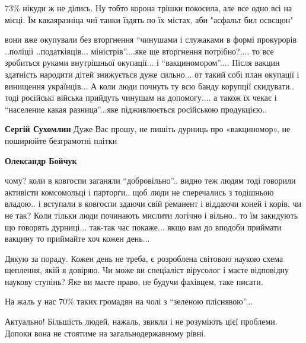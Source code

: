 \begin{itemize}
{

73\% нікуди ж не ділись. Ну тобто корона трішки покосила, але все одно всі на
місці. Їм какаяразніца чиї танки їздять по їх містах, аби "асфальт бил освєщон"


вони вже окупували без вторгнення \enquote{чинушами і служаками в формі прокурорів
..поліції ..податківців... міністрів}....яке ще вторгнення потрібно?.... то все
зробиться руками внутрішньої окупації... і \enquote{вакциномором}.... Після вакцин
здатність народити дітей знижується дуже сильно... от такий собі план окупації і
винищення українців... А коли люди почнуть ту всю банду корупції скидувати.. тоді
російські війська прийдуть чинушам на допомогу.... а також їх чекає і \enquote{население
какая разница}...яке підживлюється російською продукцією..  

\begin{itemize} %
\textbf{Сергій Сухомлин}
Дуже Вас прошу, не пишіть дурниць про «вакциномор», не поширюйте безграмотні плітки

\textbf{Олександр Бойчук} 

чому? коли в ковгоспи заганяли \enquote{добровільно}.. видно теж людям тоді говорили
активісти комсомольці і парторги.. щоб люди не сперечались з тодішньою владою.. і
вступали в ковгоспи здаючи свій реманент і віддаючи коней і корів, чи не так?
Коли тільки люди починають мислити логічно і вільно.. то їм закидують що
говорять дурниці... так-так час покаже... якщо вам до вподоби приймати вакцину то
приймайте хоч кожен день...


Дякую за пораду. Кожен день не треба, є розроблена світовою наукою схема
щеплення, якій я довіряю. Чи може ви спеціаліст вірусолог і маєте відповідну
наукову ступінь? Яке ви маєте право, не будучи фахівцем, таке писати.

\end{itemize} %


На жаль у нас 70\% таких громадян на чолі з \enquote{зеленою пліснявою}...


Актуально! Більшість людей, нажаль, звикли і не розуміють цієї проблеми. Допоки
вона не стоятиме на загальнодержавному рівні.


}
\end{itemize}
